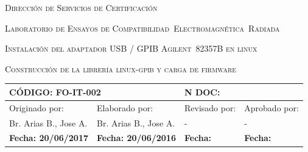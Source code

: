 \documentclass[paper=letter,oneside,fontsize=11pt]{article}
\begin{document}
	
	
	\begin{center} 
		
		\vspace{10cm}
		
		\begin{Large} 
			\textsc{Dirección de Servicios de Certificación}
			\vspace{5pt}
			\begin{spacing}{0.9}
				\textsc{Laboratorio de Ensayos de Compatibilidad~Electromagnética~Radiada}
			\end{spacing}
		\end{Large}
		
		\vfill
		
		
		\begin{LARGE}	
			\begin{spacing}{0.9}		
				\textsc{Instalación del adaptador USB / GPIB Agilent~82357B en linux}
			\end{spacing}
		\end{LARGE}			
		\vspace{5pt}
		\begin{large}			
			\textsc{Construcción de la librería linux-gpib y carga de firmware}
		\end{large}	
	
		\vfill

		
		\begin{table}[!b]
			\begin{tabularx}{\linewidth}{|X|X|X|X|}	
				\hline				
				\multicolumn{2}{|l|}{\textbf{CÓDIGO}: FO-IT-002} & \multicolumn{2}{l|}{\textbf{N DOC:}} \\
				\hline
				Originado por:	& 	Elaborado por: & 
				Revisado por: 	& 	Aprobado por: \\
				\hline
				Br. Arias B., Jose A. & Br. Arias B., Jose A. & - & - \\
				\hline
				\textbf{Fecha: 20/06/2017 } & 
				\textbf{Fecha: 20/06/2016} & 
				\textbf{Fecha: } &
				\textbf{Fecha: } \\				
			\end{tabularx}	
		\end{table}	
		
		\vspace{10mm}
		
	\end{center}
	
	
\end{document}
